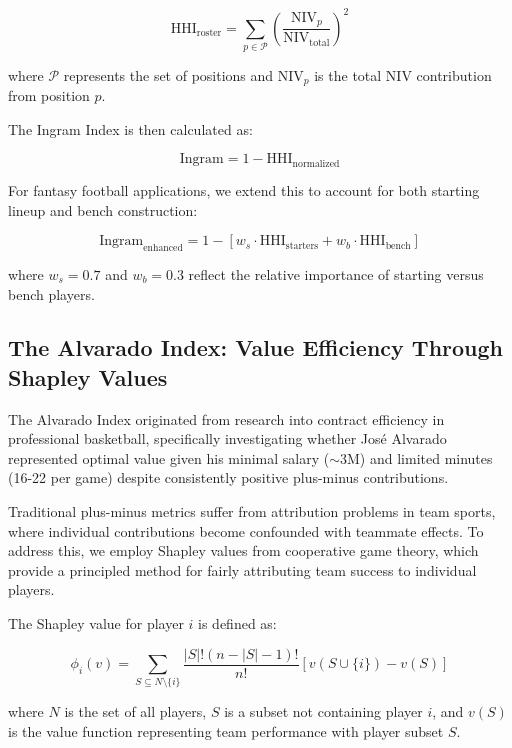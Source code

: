 \documentclass[11pt]{article}
\begin{document}
\begin{equation}
\text{HHI}_{\text{roster}} = \sum_{p \in \mathcal{P}} \left(\frac{\text{NIV}_p}{\text{NIV}_{\text{total}}}\right)^2
\end{equation}

where $\mathcal{P}$ represents the set of positions and $\text{NIV}_p$ is the total NIV contribution from position $p$.

The Ingram Index is then calculated as:

\begin{equation}
\text{Ingram} = 1 - \text{HHI}_{\text{normalized}}
\end{equation}

For fantasy football applications, we extend this to account for both starting lineup and bench construction:

\begin{equation}
\text{Ingram}_{\text{enhanced}} = 1 - [w_s \cdot \text{HHI}_{\text{starters}} + w_b \cdot \text{HHI}_{\text{bench}}]
\end{equation}

where $w_s = 0.7$ and $w_b = 0.3$ reflect the relative importance of starting versus bench players.

\subsection{The Alvarado Index: Value Efficiency Through Shapley Values}

The Alvarado Index originated from research into contract efficiency in professional basketball, specifically investigating whether José Alvarado represented optimal value given his minimal salary ($\sim$3M) and limited minutes (16-22 per game) despite consistently positive plus-minus contributions.

Traditional plus-minus metrics suffer from attribution problems in team sports, where individual contributions become confounded with teammate effects. To address this, we employ Shapley values from cooperative game theory, which provide a principled method for fairly attributing team success to individual players.

The Shapley value for player $i$ is defined as:

\begin{equation}
\phi_i(v) = \sum_{S \subseteq N \setminus \{i\}} \frac{|S|!(n-|S|-1)!}{n!}[v(S \cup \{i\}) - v(S)]
\end{equation}

where $N$ is the set of all players, $S$ is a subset not containing player $i$, and $v(S)$ is the value function representing team performance with player subset $S$.
\end{document}
